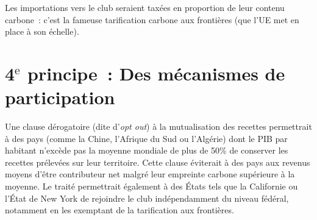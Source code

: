 \documentclass[a5paper,french]{memoir}
\begin{document}


Les importations vers le club seraient taxées en proportion de leur contenu carbone~: c'est la fameuse tarification carbone aux frontières (que l'UE met en place à son échelle).

\section{4$^\text{e}$ principe~: Des mécanismes de participation}

Une clause dérogatoire (dite d'\textit{opt out}) à la mutualisation des recettes permettrait à des pays (comme la Chine, l'Afrique du Sud ou l'Algérie) dont le PIB par habitant n'excède pas la moyenne mondiale de plus de 50\% de conserver les recettes prélevées sur leur territoire. Cette clause éviterait à des pays aux revenus moyens d'être contributeur net malgré leur empreinte carbone supérieure à la moyenne.
Le traité permettrait également à des États tels que la Californie ou l'État de New York de rejoindre le club indépendamment du niveau fédéral, notamment en les exemptant de la tarification aux frontières.




\end{document}
